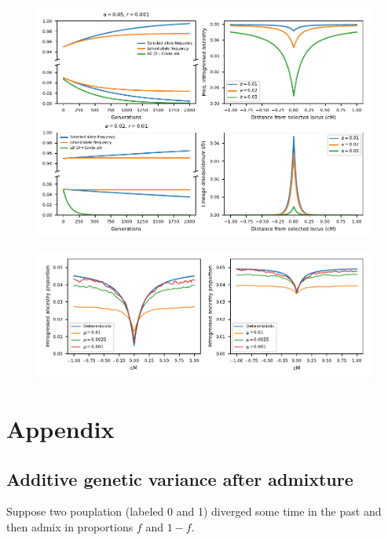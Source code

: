 \documentclass{article}
\begin{document}
\begin{figure}[ht!]
    \centering
    \includegraphics{../figures/linkage_predictions.pdf}
    \caption{
        \textbf{}
    }
    \label{fig:linkage-pred}
\end{figure}

\begin{figure}[ht!]
    \centering
    \includegraphics{../figures/linkage_simulation.pdf}
    \caption{
        \textbf{}
    }
    \label{fig:linkage-sim}
\end{figure}


\clearpage




\section{Appendix}

\subsection{Additive genetic variance after admixture}

Suppose two pouplation (labeled 0 and 1) diverged some time in the past and
then admix in proportions $f$ and $1-f$.
\end{document}
